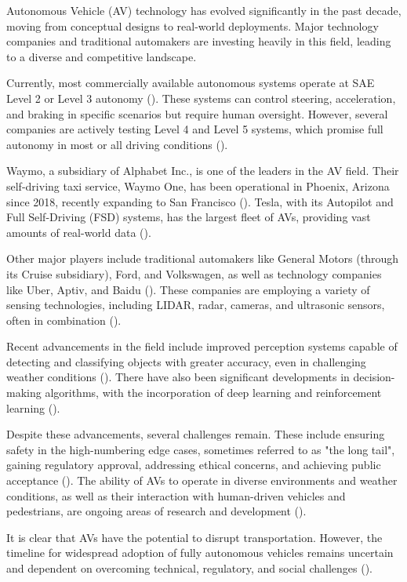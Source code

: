Autonomous Vehicle (AV) technology has evolved significantly in the past decade, moving from conceptual designs to real-world deployments. Major technology companies and traditional automakers are investing heavily in this field, leading to a diverse and competitive landscape.

Currently, most commercially available autonomous systems operate at SAE Level 2 or Level 3 autonomy (\cite{SAE2021}). These systems can control steering, acceleration, and braking in specific scenarios but require human oversight. However, several companies are actively testing Level 4 and Level 5 systems, which promise full autonomy in most or all driving conditions (\cite{Yurtsever2020}).

Waymo, a subsidiary of Alphabet Inc., is one of the leaders in the AV field. Their self-driving taxi service, Waymo One, has been operational in Phoenix, Arizona since 2018, recently expanding to San Francisco (\cite{Waymo2023}). Tesla, with its Autopilot and Full Self-Driving (FSD) systems, has the largest fleet of AVs, providing vast amounts of real-world data (\cite{Tesla2023}).

Other major players include traditional automakers like General Motors (through its Cruise subsidiary), Ford, and Volkswagen, as well as technology companies like Uber, Aptiv, and Baidu (\cite{Koopman2019}). These companies are employing a variety of sensing technologies, including LIDAR, radar, cameras, and ultrasonic sensors, often in combination (\cite{Yurtsever2020}).

Recent advancements in the field include improved perception systems capable of detecting and classifying objects with greater accuracy, even in challenging weather conditions (\cite{Grigorescu2020}). There have also been significant developments in decision-making algorithms, with the incorporation of deep learning and reinforcement learning (\cite{Kiran2021}).

Despite these advancements, several challenges remain. These include ensuring safety in the high-numbering edge cases, sometimes referred to as "the long tail", gaining regulatory approval, addressing ethical concerns, and achieving public acceptance (\cite{Koopman2019}). The ability of AVs to operate in diverse environments and weather conditions, as well as their interaction with human-driven vehicles and pedestrians, are ongoing areas of research and development (\cite{Yurtsever2020}).

It is clear that AVs have the potential to disrupt transportation. However, the timeline for widespread adoption of fully autonomous vehicles remains uncertain and dependent on overcoming technical, regulatory, and social challenges (\cite{Litman2023}).


